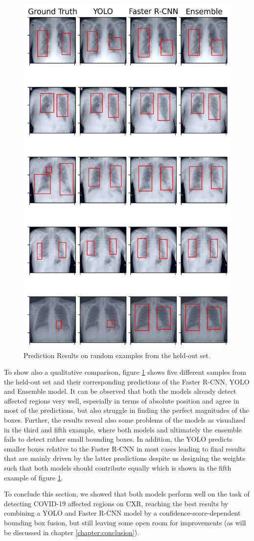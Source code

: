\begin{figure}[h!]
	\centering
	\includegraphics[width=0.6\linewidth]{img/combo.png}
	\caption{Prediction Results on random examples from the held-out set.}
	\label{fig:combo_eval}
\end{figure}

To show also a qualitative comparison, figure \ref{fig:combo_eval} shows five different samples from the held-out set and their corresponding predictions of the Faster \ac{R-CNN}, \ac{YOLO} and Ensemble model. It can be observed that both the models already detect affected regions very well, especially in terms of absolute position and agree in most of the predictions, but also struggle in finding the perfect magnitudes of the boxes. Further, the results reveal also some problems of the models as visualized in the third and fifth example, where both models and ultimately the ensemble fails to detect rather small bounding boxes. In addition, the \ac{YOLO} predicts smaller boxes relative to the Faster \ac{R-CNN} in most cases leading to final results that are mainly driven by the latter predictions despite us designing the weights such that both models should contribute equally which is shown in the fifth example of figure \ref{fig:combo_eval}. 

To conclude this section, we showed that both models perform well on the task of detecting COVID-19 affected regions on \ac{CXR}, reaching the best results by combining a \ac{YOLO} and Faster \ac{R-CNN} model by a confidence-score-dependent bounding box fusion, but still leaving some open room for improvements (as will be discussed in chapter \ref{chapter:conclusion}).

